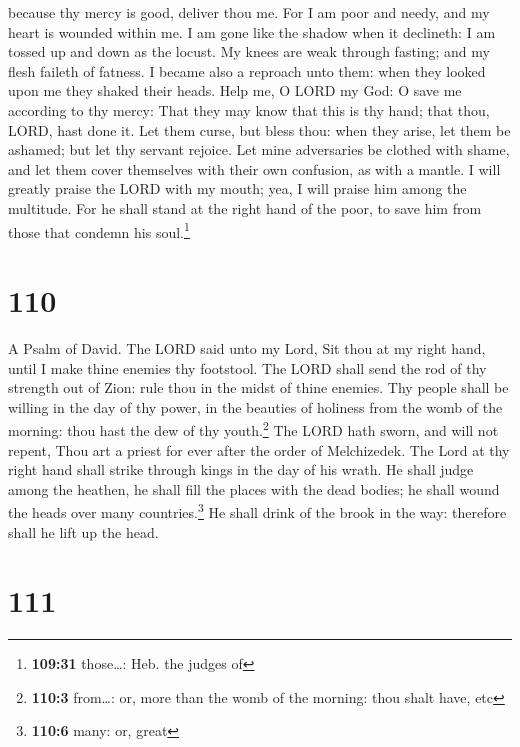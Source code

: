 because thy mercy is good, deliver thou me.  For I am
poor and needy, and my heart is wounded within me.  I am
gone like the shadow when it declineth: I am tossed up and down as the
locust.  My knees are weak through fasting; and my flesh
faileth of fatness.  I became also a reproach unto them:
when they looked upon me they shaked their heads.  Help
me, O LORD my God: O save me according to thy mercy: 
That they may know that this is thy hand; that thou, LORD, hast done it.
 Let them curse, but bless thou: when they arise, let
them be ashamed; but let thy servant rejoice.  Let mine
adversaries be clothed with shame, and let them cover themselves with
their own confusion, as with a mantle.  I will greatly
praise the LORD with my mouth; yea, I will praise him among the
multitude.  For he shall stand at the right hand of the
poor, to save him from those that condemn his soul.\footnote{\textbf{109:31}
  those\ldots: Heb. the judges of}

\hypertarget{section-109}{%
\section{110}\label{section-109}}

A Psalm of David.  The LORD said unto my Lord, Sit thou at
my right hand, until I make thine enemies thy footstool. 
The LORD shall send the rod of thy strength out of Zion: rule thou in
the midst of thine enemies.  Thy people shall be willing
in the day of thy power, in the beauties of holiness from the womb of
the morning: thou hast the dew of thy youth.\footnote{\textbf{110:3}
  from\ldots: or, more than the womb of the morning: thou shalt have,
  etc}  The LORD hath sworn, and will not repent, Thou art
a priest for ever after the order of Melchizedek.  The
Lord at thy right hand shall strike through kings in the day of his
wrath.  He shall judge among the heathen, he shall fill
the places with the dead bodies; he shall wound the heads over many
countries.\footnote{\textbf{110:6} many: or, great}  He
shall drink of the brook in the way: therefore shall he lift up the
head.

\hypertarget{section-110}{%
\section{111}\label{section-110}}

